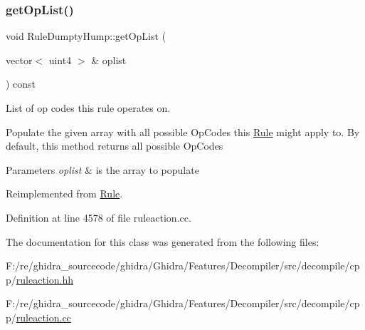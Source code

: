 \subsubsection{\texorpdfstring{getOpList()}{getOpList()}}
{\footnotesize\ttfamily void Rule\+Dumpty\+Hump\+::get\+Op\+List (\begin{DoxyParamCaption}\item[{vector$<$ uint4 $>$ \&}]{oplist }\end{DoxyParamCaption}) const\hspace{0.3cm}{\ttfamily [virtual]}}



List of op codes this rule operates on. 

Populate the given array with all possible Op\+Codes this \mbox{\hyperlink{class_rule}{Rule}} might apply to. By default, this method returns all possible Op\+Codes 
\begin{DoxyParams}{Parameters}
{\em oplist} & is the array to populate \\
\hline
\end{DoxyParams}


Reimplemented from \mbox{\hyperlink{class_rule_a4023bfc7825de0ab866790551856d10e}{Rule}}.



Definition at line 4578 of file ruleaction.\+cc.



The documentation for this class was generated from the following files\+:\begin{DoxyCompactItemize}
\item 
F\+:/re/ghidra\+\_\+sourcecode/ghidra/\+Ghidra/\+Features/\+Decompiler/src/decompile/cpp/\mbox{\hyperlink{ruleaction_8hh}{ruleaction.\+hh}}\item 
F\+:/re/ghidra\+\_\+sourcecode/ghidra/\+Ghidra/\+Features/\+Decompiler/src/decompile/cpp/\mbox{\hyperlink{ruleaction_8cc}{ruleaction.\+cc}}\end{DoxyCompactItemize}
